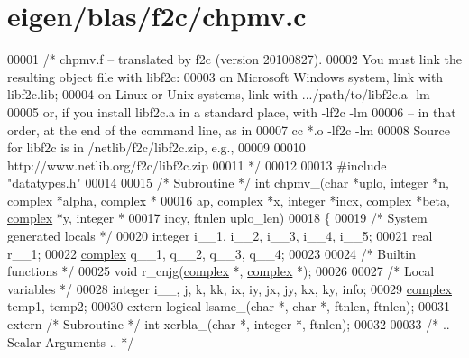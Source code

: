 \hypertarget{eigen_2blas_2f2c_2chpmv_8c_source}{}\section{eigen/blas/f2c/chpmv.c}
\label{eigen_2blas_2f2c_2chpmv_8c_source}

\begin{DoxyCode}
00001 \textcolor{comment}{/* chpmv.f -- translated by f2c (version 20100827).}
00002 \textcolor{comment}{   You must link the resulting object file with libf2c:}
00003 \textcolor{comment}{    on Microsoft Windows system, link with libf2c.lib;}
00004 \textcolor{comment}{    on Linux or Unix systems, link with .../path/to/libf2c.a -lm}
00005 \textcolor{comment}{    or, if you install libf2c.a in a standard place, with -lf2c -lm}
00006 \textcolor{comment}{    -- in that order, at the end of the command line, as in}
00007 \textcolor{comment}{        cc *.o -lf2c -lm}
00008 \textcolor{comment}{    Source for libf2c is in /netlib/f2c/libf2c.zip, e.g.,}
00009 \textcolor{comment}{}
00010 \textcolor{comment}{        http://www.netlib.org/f2c/libf2c.zip}
00011 \textcolor{comment}{*/}
00012 
00013 \textcolor{preprocessor}{#include "datatypes.h"}
00014 
00015 \textcolor{comment}{/* Subroutine */} \textcolor{keywordtype}{int} chpmv\_(\textcolor{keywordtype}{char} *uplo, integer *n, \hyperlink{structcomplex}{complex} *alpha, 
      \hyperlink{structcomplex}{complex} *
00016     ap, \hyperlink{structcomplex}{complex} *x, integer *incx, \hyperlink{structcomplex}{complex} *beta, \hyperlink{structcomplex}{complex} *y, integer *
00017     incy, ftnlen uplo\_len)
00018 \{
00019     \textcolor{comment}{/* System generated locals */}
00020     integer i\_\_1, i\_\_2, i\_\_3, i\_\_4, i\_\_5;
00021     real r\_\_1;
00022     \hyperlink{structcomplex}{complex} q\_\_1, q\_\_2, q\_\_3, q\_\_4;
00023 
00024     \textcolor{comment}{/* Builtin functions */}
00025     \textcolor{keywordtype}{void} r\_cnjg(\hyperlink{structcomplex}{complex} *, \hyperlink{structcomplex}{complex} *);
00026 
00027     \textcolor{comment}{/* Local variables */}
00028     integer i\_\_, j, k, kk, ix, iy, jx, jy, kx, ky, info;
00029     \hyperlink{structcomplex}{complex} temp1, temp2;
00030     \textcolor{keyword}{extern} logical lsame\_(\textcolor{keywordtype}{char} *, \textcolor{keywordtype}{char} *, ftnlen, ftnlen);
00031     \textcolor{keyword}{extern} \textcolor{comment}{/* Subroutine */} \textcolor{keywordtype}{int} xerbla\_(\textcolor{keywordtype}{char} *, integer *, ftnlen);
00032 
00033 \textcolor{comment}{/*     .. Scalar Arguments .. */}

\end{DoxyCode}
